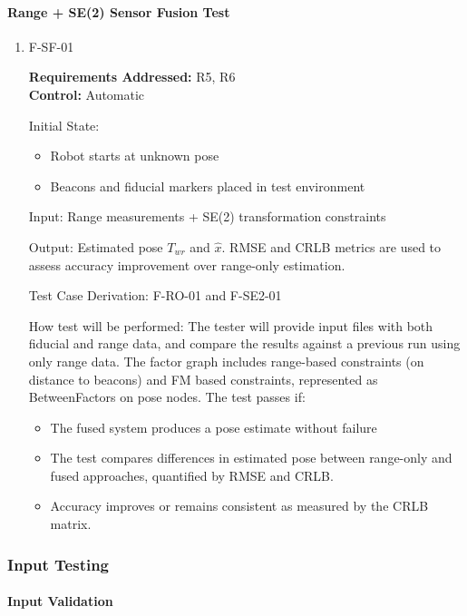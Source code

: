 \documentclass[12pt, titlepage]{article}
\begin{document}
\paragraph{Range + SE(2) Sensor Fusion Test}
\begin{enumerate}
\item{F-SF-01}

\textbf{Requirements Addressed:} R5, R6\\
\textbf{Control:} Automatic
					
Initial State: 
\begin{itemize}
  \item Robot starts at unknown pose
  \item Beacons and fiducial markers placed in test environment
\end{itemize}
					
Input: Range measurements + SE(2) transformation constraints

Output: Estimated pose $T_{wr}$ and $\hat{x}$. RMSE and CRLB metrics are used to assess accuracy improvement over range-only estimation.

Test Case Derivation: F-RO-01 and F-SE2-01

How test will be performed: The tester will provide input files with both fiducial and range data, and compare the results against a previous run using only range data. The factor graph includes range-based constraints (on distance to beacons) and FM based constraints, represented as BetweenFactors on pose nodes. The test passes if:
\begin{itemize}
  \item The fused system produces a pose estimate without failure
  \item The test compares differences in estimated pose between range-only and fused approaches, quantified by RMSE and CRLB.
  \item Accuracy improves or remains consistent as measured by the CRLB matrix.
\end{itemize}

\end{enumerate}

\subsubsection{Input Testing}
\paragraph{Input Validation}
\end{document}
